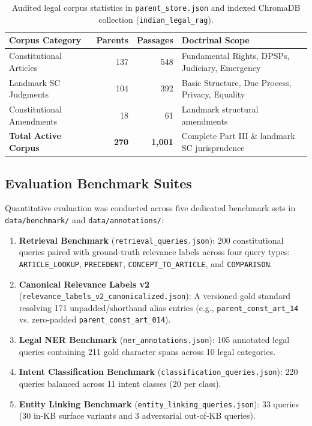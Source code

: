 \documentclass[10pt,twocolumn]{article}
\begin{document}
\begin{table}[t]
\centering
\small
\caption{Audited legal corpus statistics in \texttt{parent\_store.json} and indexed ChromaDB collection (\texttt{indian\_legal\_rag}).}
\begin{tabularx}{\columnwidth}{lrrX}
\toprule
\textbf{Corpus Category} & \textbf{Parents} & \textbf{Passages} & \textbf{Doctrinal Scope} \\
\midrule
Constitutional Articles   & 137 & 548 & Fundamental Rights, DPSPs, Judiciary, Emergency \\
Landmark SC Judgments     & 104 & 392 & Basic Structure, Due Process, Privacy, Equality \\
Constitutional Amendments &  18 &  61 & Landmark structural amendments \\
\midrule
\textbf{Total Active Corpus} & \textbf{270} & \textbf{1,001} & Complete Part III \& landmark SC jurisprudence \\
\bottomrule
\end{tabularx}
\label{tab:corpus_stats}
\end{table}

\subsection{Evaluation Benchmark Suites}
Quantitative evaluation was conducted across five dedicated benchmark sets in \texttt{data/benchmark/} and \texttt{data/annotations/}:
\begin{enumerate}[leftmargin=*]
    \item \textbf{Retrieval Benchmark} (\texttt{retrieval\_queries.json}): 200 constitutional queries paired with ground-truth relevance labels across four query types: \texttt{ARTICLE\_LOOKUP}, \texttt{PRECEDENT}, \texttt{CONCEPT\_TO\_ARTICLE}, and \texttt{COMPARISON}.
    \item \textbf{Canonical Relevance Labels v2} (\texttt{relevance\_labels\_v2\_canonicalized.json}): A versioned gold standard resolving 171 unpadded/shorthand alias entries (e.g., \texttt{parent\_const\_art\_14} vs. zero-padded \texttt{parent\_const\_art\_014}).
    \item \textbf{Legal NER Benchmark} (\texttt{ner\_annotations.json}): 105 annotated legal queries containing 211 gold character spans across 10 legal categories.
    \item \textbf{Intent Classification Benchmark} (\texttt{classification\_queries.json}): 220 queries balanced across 11 intent classes (20 per class).
    \item \textbf{Entity Linking Benchmark} (\texttt{entity\_linking\_queries.json}): 33 queries (30 in-KB surface variants and 3 adversarial out-of-KB queries).
\end{enumerate}
\end{document}
